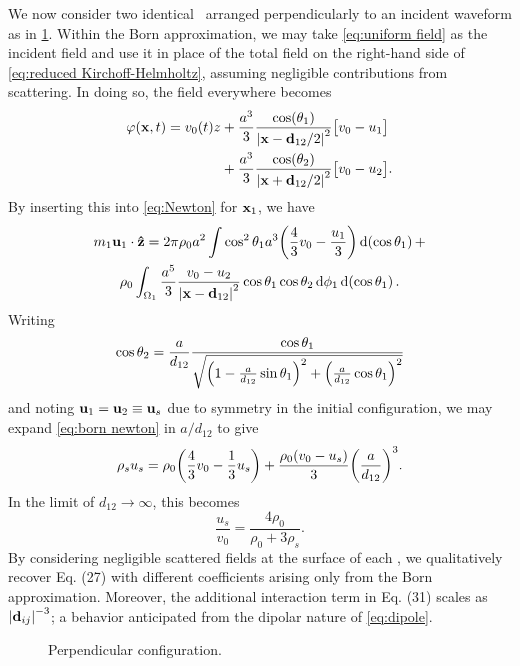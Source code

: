 We now consider two identical \bubbles\ arranged perpendicularly to an incident waveform as in \cref{fig:perpendicular}.
Within the Born approximation, we may take \cref{eq:uniform field} as the incident field and use it in place of the total field on the right-hand side of \cref{eq:reduced Kirchoff-Helmholtz}, assuming negligible contributions from scattering. In doing so, the field everywhere becomes
\begin{equation}
  \begin{aligned}
  \varphi(\vb{x}, t) = v_0(t) z &+ \frac{a^3}{3} \frac{\cos(\theta_1)}{\abs{\vb{x} - \vb{d}_{12}/2}^2}\qty\big[v_0 - u_1] \\
                                &+ \frac{a^3}{3} \frac{\cos(\theta_2)}{\abs{\vb{x} + \vb{d}_{12}/2}^2}\qty\big[v_0 - u_2].
  \end{aligned}
\end{equation}
By inserting this into \cref{eq:Newton} for $\vb{x}_1$, we have
\begin{equation}
  \label{eq:born newton}
  \begin{gathered}
  m_1 \vb{u}_1 \cdot \vu{z} = 2 \pi \rho_0 a^2 \int \cos^2\theta_1 a^3 \qty(\frac{4}{3}v_0 - \frac{u_1}{3}) \dd{\qty(\cos\theta_1)} + \\
    \rho_0 \int_{\Omega_1} \frac{a^5}{3} \frac{v_0 - u_2}{\abs{\vb{x} - \vb{d}_{12}}^2} \cos\theta_1 \cos\theta_2 \dd{\phi_1} \dd{\qty(\cos \theta_1)}.
  \end{gathered}
\end{equation}
Writing
\begin{equation}
  \cos\theta_2 = \frac{a}{d_{12}} \frac{\cos\theta_1}{\sqrt{\qty(1 - \frac{a}{d_{12}}\sin\theta_1)^2 + \qty(\frac{a}{d_{12}}\cos\theta_1)^2}}
\end{equation}
and noting $\vb{u}_1 = \vb{u}_2 \equiv \vb{u}_s$ due to symmetry in the initial configuration, we may expand \cref{eq:born newton} in $a/d_{12}$ to give
\begin{equation}
  \label{eq:two bubble born}
  \rho_s u_s = \rho_0\qty(\frac{4}{3}v_0 - \frac{1}{3}u_s) + \frac{\rho_0\qty(v_0 - u_s)}{3}\qty(\frac{a}{d_{12}})^3.
\end{equation}
In the limit of $d_{12} \to \infty$, this becomes
\begin{equation}
  \frac{u_s}{v_0} = \frac{4 \rho_0}{\rho_0 + 3\rho_s}.
\end{equation}
By considering negligible scattered fields at the surface of each \bubble, we qualitatively recover Eq. (27) with different coefficients arising only from the Born approximation.
Moreover, the additional interaction term in Eq. (31) scales as $\abs{\vb{d}_{ij}}^{-3}$; a behavior anticipated from the dipolar nature of \cref{eq:dipole}.

\begin{figure}
  \centering
  
  \caption{\label{fig:perpendicular}Perpendicular configuration.}
\end{figure}


